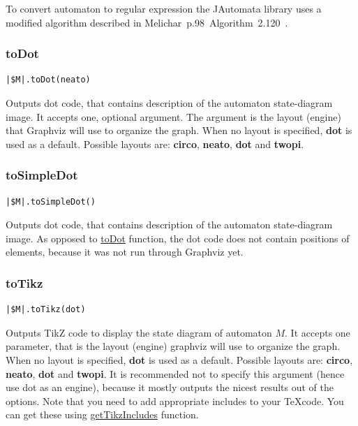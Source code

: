 \documentclass{ctuthesis}
\begin{document}
To convert automaton to regular expression the JAutomata library uses a modified algorithm described in Melichar~p.98~Algorithm~2.120~\cite{melichar}.

\subsubsection{toDot}
\label{subsec:toDot}
\begin{lstlisting}[language = JASL_snippet]
	|$M|.toDot(neato)
\end{lstlisting}

Outputs dot code, that contains description of the automaton state-diagram image. It accepts one, optional argument. The argument is the layout (engine) that Graphviz will use to organize the graph. When no layout is specified, \textbf{dot} is used as a default. Possible layouts are: \textbf{circo}, \textbf{neato}, \textbf{dot} and \textbf{twopi}. 

\subsubsection{toSimpleDot}
\begin{lstlisting}[language = JASL_snippet]
	|$M|.toSimpleDot()
\end{lstlisting}

Outputs dot code, that contains description of the automaton state-diagram image. As opposed to \hyperref[subsec:toDot]{toDot} function, the dot code does not contain positions of elements, because it was not run through Graphviz yet. 

\subsubsection{toTikz}
\begin{lstlisting}[language = JASL_snippet]
	|$M|.toTikz(dot)
\end{lstlisting}

Outputs TikZ code to display the state diagram of automaton $M$. It accepts one parameter, that is the layout (engine) graphviz will use to organize the graph. When no layout is specified, \textbf{dot} is used as a default. Possible layouts are: \textbf{circo}, \textbf{neato}, \textbf{dot} and \textbf{twopi}. It is recommended not to specify this argument (hence use dot as an engine), because it mostly outputs the nicest results out of the options. Note that you need to add appropriate includes to your \TeX code. You can get these using \hyperref[subsec:getTikzIncludes]{getTikzIncludes} function.
\end{document}

